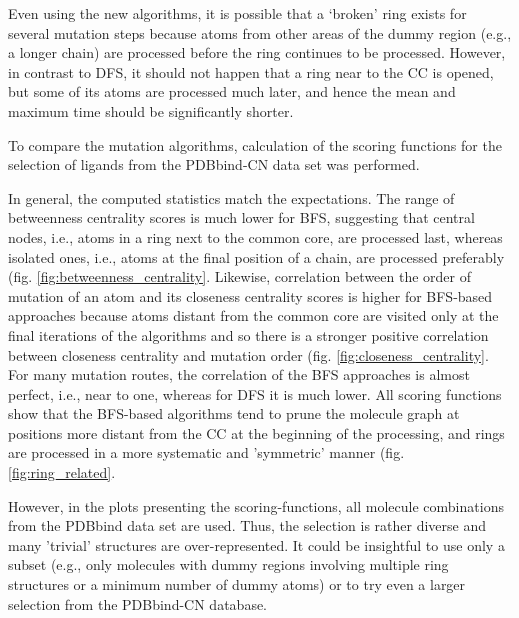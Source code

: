 Even using the new algorithms, it is possible 
that a \textquoteleft broken\textquoteright{} ring exists for several mutation steps
 because atoms from other areas of the dummy region (e.g.,
a longer chain) are processed before the ring continues to be processed. However, in contrast to DFS,
it should not happen that a ring near to the CC is opened, but some of its atoms are processed much later, and hence the mean and maximum time should be significantly shorter. 

To compare the mutation algorithms, calculation of the scoring functions for the selection of ligands from the PDBbind-CN data set was performed. 

In general, the computed statistics match the expectations. The range of betweenness centrality scores is much lower for BFS, suggesting that central nodes, i.e., atoms in a ring next to the common core, are processed last, whereas isolated ones, i.e., atoms at the final position of a chain, are processed preferably (fig. \ref{fig:betweenness_centrality}.
Likewise, correlation between the order of mutation of an atom and its closeness centrality scores is higher for BFS-based approaches because atoms distant from the common core are visited only at the final iterations of the algorithms and so there is a stronger positive correlation between closeness centrality and  mutation order (fig. \ref{fig:closeness_centrality}. For many mutation routes, the correlation of the BFS approaches is almost perfect, i.e., near to one, whereas for DFS it is much lower.
All scoring functions show that the BFS-based algorithms tend to prune the molecule graph at positions more distant from the CC at the beginning of the processing, and rings are processed in a more systematic and 'symmetric' manner (fig. \ref{fig:ring_related}.

However, in the plots presenting the scoring-functions, all molecule combinations
from the PDBbind data set are used. Thus, the selection is rather diverse and many  'trivial' structures are over-represented. It could be insightful to use
only a subset (e.g., only molecules with dummy regions involving multiple
ring structures or a minimum number of dummy atoms) or to try even a larger selection from the PDBbind-CN database.


